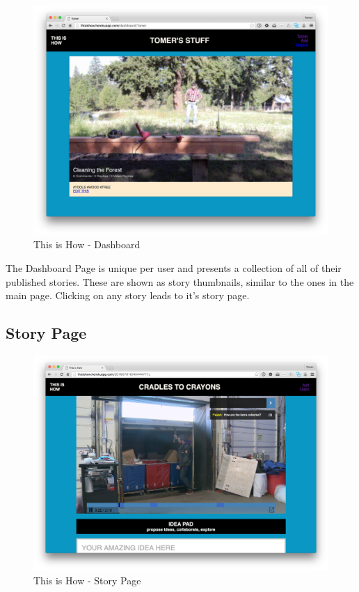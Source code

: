    \begin{figure}[thpb]
      \centering
      \includegraphics[width=\textwidth]{figures/dashboard.png}
      \caption{This is How - Dashboard}
      \label{fig_dashboard_page}
   \end{figure}

The Dashboard Page is unique per user and presents a collection of all of their published stories. These are shown as story thumbnails, similar to the ones in the main page. Clicking on any story leads to it's story page. 

\subsection{Story Page}

   \begin{figure}[thpb]
      \centering
      \includegraphics[width=\textwidth]{figures/storypage.png}
      \caption{This is How - Story Page}
      \label{fig_dashboard_page}
   \end{figure}

